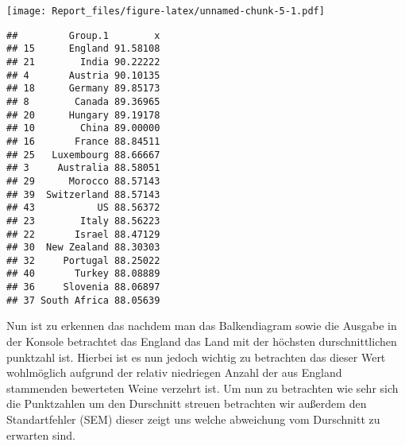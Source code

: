 \documentclass[
]{article}
\newenvironment{Shaded}{\begin{snugshade}}{\end{snugshade}}
\newcommand{\CommentTok}[1]{\textcolor[rgb]{0.56,0.35,0.01}{\textit{#1}}}
\newcommand{\DecValTok}[1]{\textcolor[rgb]{0.00,0.00,0.81}{#1}}
\newcommand{\FunctionTok}[1]{\textcolor[rgb]{0.13,0.29,0.53}{\textbf{#1}}}
\newcommand{\NormalTok}[1]{#1}
\newcommand{\SpecialCharTok}[1]{\textcolor[rgb]{0.81,0.36,0.00}{\textbf{#1}}}
\begin{document}
\texttt{[image: Report\_files/figure-latex/unnamed-chunk-5-1.pdf]}

\begin{Shaded}
\end{Shaded}

\begin{verbatim}
##         Group.1        x
## 15      England 91.58108
## 21        India 90.22222
## 4       Austria 90.10135
## 18      Germany 89.85173
## 8        Canada 89.36965
## 20      Hungary 89.19178
## 10        China 89.00000
## 16       France 88.84511
## 25   Luxembourg 88.66667
## 3     Australia 88.58051
## 29      Morocco 88.57143
## 39  Switzerland 88.57143
## 43           US 88.56372
## 23        Italy 88.56223
## 22       Israel 88.47129
## 30  New Zealand 88.30303
## 32     Portugal 88.25022
## 40       Turkey 88.08889
## 36     Slovenia 88.06897
## 37 South Africa 88.05639
\end{verbatim}

Nun ist zu erkennen das nachdem man das Balkendiagram sowie die Ausgabe
in der Konsole betrachtet das England das Land mit der höchsten
durschnittlichen punktzahl ist. Hierbei ist es nun jedoch wichtig zu
betrachten das dieser Wert wohlmöglich aufgrund der relativ niedriegen
Anzahl der aus England stammenden bewerteten Weine verzehrt ist. Um nun
zu betrachten wie sehr sich die Punktzahlen um den Durschnitt streuen
betrachten wir außerdem den Standartfehler (SEM) dieser zeigt uns welche
abweichung vom Durschnitt zu erwarten sind.
\end{document}
